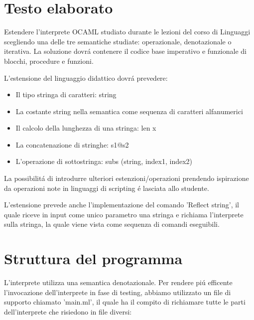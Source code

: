 \documentclass[a4paper,titlepage]{book}
\begin{document}
\pagestyle{plain}

\begin{frontespizio}
\Titoletto{}
\Sottotitolo{}
\end{frontespizio}

\frontmatter
\tableofcontents

\mainmatter
\chapter{Testo elaborato}
Estendere l'interprete OCAML studiato durante le lezioni del corso di Linguaggi scegliendo una delle tre semantiche studiate:
operazionale, denotazionale o iterativa.
La soluzione dovr\'a contenere il codice base imperativo e funzionale di blocchi, procedure e funzioni.

L'estensione del linguaggio didattico dovr\'a prevedere:
\begin{itemize}
\item Il tipo stringa di caratteri: string
\item La costante string nella semantica come sequenza di caratteri alfanumerici
\item Il calcolo della lunghezza di una stringa: len x
\item La concatenazione di stringhe: s1@s2
\item L'operazione di sottostringa: subs (string, index1, index2)
\end{itemize}

La possibilit\'a di introdurre ulteriori estenzioni/operazioni prendendo ispirazione da operazioni note in linguaggi di scripting
\'e lasciata allo studente.

L'estensione prevede anche l'implementazione del comando 'Reflect string', il quale riceve in input come unico parametro
una stringa e richiama l'interprete sulla stringa, la quale viene vista come sequenza di comandi eseguibili.

\clearpage
\thispagestyle{empty}

\chapter{Struttura del programma}
L'interprete utilizza una semantica denotazionale.
Per rendere pi\'u efficente l'invocazione dell'interprete in fase di testing, abbiamo utilizzato un file di supporto chiamato 'main.ml',
il quale ha il compito di richiamare tutte le parti dell'interprete che risiedono in file diversi:
\end{document}
